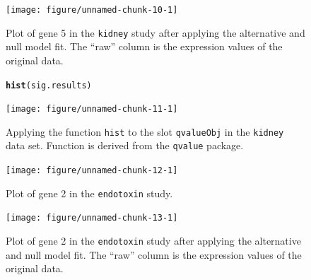 \documentclass{article}\usepackage[]{graphicx}\usepackage[]{color}
\makeatletter
\newcommand{\hlstd}[1]{\textcolor[rgb]{0.345,0.345,0.345}{#1}}%
\newcommand{\hlkwd}[1]{\textcolor[rgb]{0.737,0.353,0.396}{\textbf{#1}}}%
\newenvironment{kframe}{%
 \def\at@end@of@kframe{}%
 \ifinner\ifhmode%
  \def\at@end@of@kframe{\end{minipage}}%
  \begin{minipage}{\columnwidth}%
 \fi\fi%
 \def\FrameCommand##1{\hskip\@totalleftmargin \hskip-\fboxsep
 \colorbox{shadecolor}{##1}\hskip-\fboxsep
     \hskip-\linewidth \hskip-\@totalleftmargin \hskip\columnwidth}%
 \MakeFramed {\advance\hsize-\width
   \@totalleftmargin\z@ \linewidth\hsize
   \@setminipage}}%
 {\par\unskip\endMakeFramed%
 \at@end@of@kframe}
\newenvironment{knitrout}{}{} %
\makeatother
\begin{document}
\begin{figure}[!htbp]
 \centering
\begin{knitrout}
\color{fgcolor}

{\centering \texttt{[image: figure/unnamed-chunk-10-1]} 

}



\end{knitrout}
\caption{Plot of gene 5 in the {\tt kidney} study after applying the alternative and null model fit. The ``raw'' column is the expression values of the original data.}
\label{fig:kplotFit}
\end{figure}


\begin{figure}[!htbp]
 \centering
\begin{knitrout}
\color{fgcolor}\begin{kframe}
\begin{alltt}
\hlkwd{hist}\hlstd{(sig.results)}
\end{alltt}
\end{kframe}

{\centering \texttt{[image: figure/unnamed-chunk-11-1]} 

}



\end{knitrout}
\caption{Applying the function {\tt hist} to the slot {\tt qvalueObj} in the {\tt kidney} data set. Function is derived from the {\tt qvalue} package.}
\label{fig:kqvalHist}
\end{figure}


\begin{figure}[!htbp]
 \centering
\begin{knitrout}
\color{fgcolor}

{\centering \texttt{[image: figure/unnamed-chunk-12-1]} 

}



\end{knitrout}
\caption{Plot of gene 2 in the {\tt endotoxin} study.}
\label{fig:eplot}
\end{figure}


\begin{figure}[!htbp]
 \centering
\begin{knitrout}
\color{fgcolor}

{\centering \texttt{[image: figure/unnamed-chunk-13-1]} 

}



\end{knitrout}
\caption{Plot of gene 2 in the {\tt endotoxin} study after applying the alternative and null model fit. The ``raw'' column is the expression values of the original data.}
\label{fig:eplotFit}
\end{figure}
\end{document}
